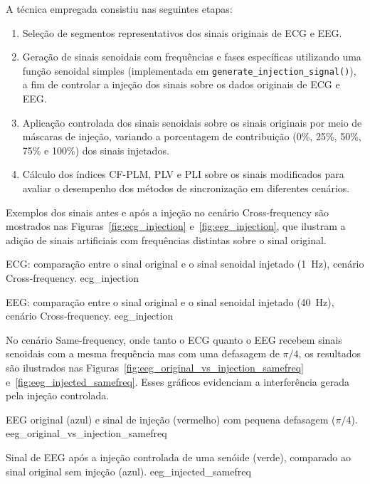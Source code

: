 \begin{itemize}
A técnica empregada consistiu nas seguintes etapas:
\begin{enumerate}
    \item Seleção de segmentos representativos dos sinais originais de ECG e EEG.
    \item Geração de sinais senoidais com frequências e fases específicas utilizando uma função senoidal simples (implementada em \texttt{generate\_injection\_signal()}), a fim de controlar a injeção dos sinais sobre os dados originais de ECG e EEG.
    \item Aplicação controlada dos sinais senoidais sobre os sinais originais por meio de máscaras de injeção, variando a porcentagem de contribuição (0\%, 25\%, 50\%, 75\% e 100\%) dos sinais injetados.
    \item Cálculo dos índices CF-PLM, PLV e PLI sobre os sinais modificados para avaliar o desempenho dos métodos de sincronização em diferentes cenários.
\end{enumerate}


Exemplos dos sinais antes e após a injeção no cenário Cross-frequency são mostrados nas Figuras~\ref{fig:ecg_injection} e~\ref{fig:eeg_injection}, que ilustram a adição de sinais artificiais com frequências distintas sobre o sinal original.

{ECG: comparação entre o sinal original e o sinal senoidal injetado (1~Hz), cenário Cross-frequency.}
{ecg_injection}

{EEG: comparação entre o sinal original e o sinal senoidal injetado (40~Hz), cenário Cross-frequency.}
{eeg_injection}


No cenário Same-frequency, onde tanto o ECG quanto o EEG recebem sinais senoidais com a mesma frequência mas com uma defasagem de \(\pi/4\), os resultados são ilustrados nas Figuras~\ref{fig:eeg_original_vs_injection_samefreq} e~\ref{fig:eeg_injected_samefreq}. Esses gráficos evidenciam a interferência gerada pela injeção controlada.

{EEG original (azul) e sinal de injeção (vermelho) com pequena defasagem (\(\pi/4\)).}
{eeg_original_vs_injection_samefreq}

{Sinal de EEG após a injeção controlada de uma senóide (verde), comparado ao sinal original sem injeção (azul).}
{eeg_injected_samefreq}


\end{itemize}
